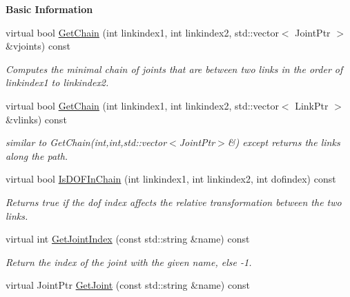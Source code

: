 \begin{Indent}{\bf Basic Information}
\begin{DoxyCompactItemize}
virtual bool \hyperlink{classOpenRAVE_1_1KinBody_a81d58139430e2200f75c1bbba99c6a74}{GetChain} (int linkindex1, int linkindex2, std::vector$<$ JointPtr $>$ \&vjoints) const 
\begin{DoxyCompactList}\small\item\em Computes the minimal chain of joints that are between two links in the order of linkindex1 to linkindex2. \item\end{DoxyCompactList}\item 
\hypertarget{classOpenRAVE_1_1KinBody_ac6b65af9a7369ff0141880abf1576c33}{
virtual bool \hyperlink{classOpenRAVE_1_1KinBody_ac6b65af9a7369ff0141880abf1576c33}{GetChain} (int linkindex1, int linkindex2, std::vector$<$ LinkPtr $>$ \&vlinks) const }
\label{classOpenRAVE_1_1KinBody_ac6b65af9a7369ff0141880abf1576c33}

\begin{DoxyCompactList}\small\item\em similar to GetChain(int,int,std::vector$<$JointPtr$>$\&) except returns the links along the path. \item\end{DoxyCompactList}\item 
virtual bool \hyperlink{classOpenRAVE_1_1KinBody_a0367d00b79b29dae5c647b169432b2a9}{IsDOFInChain} (int linkindex1, int linkindex2, int dofindex) const 
\begin{DoxyCompactList}\small\item\em Returns true if the dof index affects the relative transformation between the two links. \item\end{DoxyCompactList}\item 
\hypertarget{classOpenRAVE_1_1KinBody_a65ecee02fe64e7adf7609aa5375f0bcd}{
virtual int \hyperlink{classOpenRAVE_1_1KinBody_a65ecee02fe64e7adf7609aa5375f0bcd}{GetJointIndex} (const std::string \&name) const }
\label{classOpenRAVE_1_1KinBody_a65ecee02fe64e7adf7609aa5375f0bcd}

\begin{DoxyCompactList}\small\item\em Return the index of the joint with the given name, else -\/1. \item\end{DoxyCompactList}\item 
\hypertarget{classOpenRAVE_1_1KinBody_ae299b01185a923df10e1fc9fe0fc58be}{
virtual JointPtr \hyperlink{classOpenRAVE_1_1KinBody_ae299b01185a923df10e1fc9fe0fc58be}{GetJoint} (const std::string \&name) const }
\label{classOpenRAVE_1_1KinBody_ae299b01185a923df10e1fc9fe0fc58be}


\end{DoxyCompactItemize}
\end{Indent}
